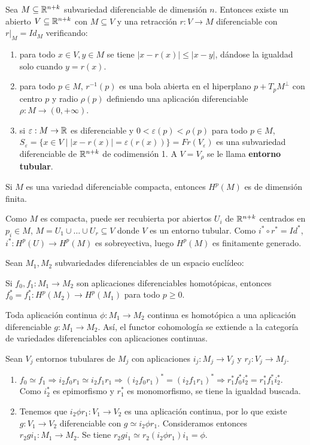 \documentclass[CV.tex]{subfiles}
\begin{document}
\begin{teorema}

Sea $M\subseteq\mathbb{R}^{n+k}$ subvariedad diferenciable de dimensión $n$. Entonces existe un abierto $V\subseteq\mathbb{R}^{n+k}$ con $M\subseteq V$ y una retracción $r:V\to M$ diferenciable con $r|_M=Id_M$ verificando:
\begin{enumerate}
\item para todo $x\in V, y\in M$ se tiene $|x-r(x)|\leq|x-y|$, dándose la igualdad solo cuando $y=r(x)$. 
\item para todo $p\in M$, $r^{-1}(p)$ es una bola abierta en el hiperplano $p+T_pM^{\perp}$ con centro $p$ y radio $\rho(p)$ definiendo una aplicación diferenciable $\rho:M\to (0,+\infty)$. 
\item si $\varepsilon:M\to\mathbb{R}$ es diferenciable y $0<\varepsilon(p)<\rho(p)$ para todo $p\in M$, $S_{\varepsilon}=\{x\in V\mid |x-r(x)|=\varepsilon(r(x))\}=Fr(V_{\varepsilon})$ es una subvariedad diferenciable de $\mathbb{R}^{n+k}$ de codimensión 1.  A $V=V_\rho$ se le llama \textbf{entorno tubular}.
\end{enumerate}
\end{teorema}


\begin{prop}
Si $M$ es una variedad diferenciable compacta, entonces $H^p(M)$ es de dimensión finita.
\end{prop}
\begin{dem}
Como $M$ es compacta, puede ser recubierta por abiertos $U_i$ de $\mathbb{R}^{n+k}$ centrados en $p_i\in M$, $M=U_1\cup\dots\cup U_r\subseteq V$ donde $V$ es un entorno tubular. Como $i^*\circ r^*=Id^*$, $i^*:H^p(U)\to H^p(M)$ es sobreyectiva, luego $H^p(M)$ es finitamente generado. \QED
\end{dem}

\begin{prop}
Sean $M_1,M_2$ subvariedades diferenciables de un espacio euclídeo:
\item Si $f_0,f_1:M_1\to M_2$ son aplicaciones diferenciables homotópicas, entonces $f_0^*=f_1^*:H^p(M_2)\to H^p(M_1)$ para todo $p\geq 0$.
\item Toda aplicación continua $\phi:M_1\to M_2$ continua es homotópica a una aplicación diferenciable $g:M_1\to M_2$. Así, el functor cohomología se extiende a la categoría de variedades diferenciables con aplicaciones continuas.
\end{prop}
\begin{dem}
Sean $V_j$ entornos tubulares de $M_j$ con aplicaciones $i_j:M_j\to V_j $ y $r_j:V_j\to M_j$.
\begin{enumerate}
\item $f_0\simeq f_1\Rightarrow i_2f_0r_1\simeq i_2f_1r_1\Rightarrow (i_2f_0r_1)^*=(i_2f_1r_1)^*\Rightarrow r_1^*f_0^*i_2^*=r_1^*f_1^*i_2^*$. Como $i_2^*$ es epimorfismo y $r_1^*$ es monomorfismo, se tiene la igualdad buscada.
\item Tenemos que $i_2\phi r_1:V_1\to V_2$ es una aplicación continua, por lo que existe $g:V_1\to V_2$ diferenciable con $g\simeq i_2\phi r_1$. Consideramos entonces $r_2gi_1:M_1\to M_2$. Se tiene $r_2gi_1\simeq r_2(i_2\phi r_1)i_1=\phi$. 
\end{enumerate}
\QED
\end{dem}
\end{document}
